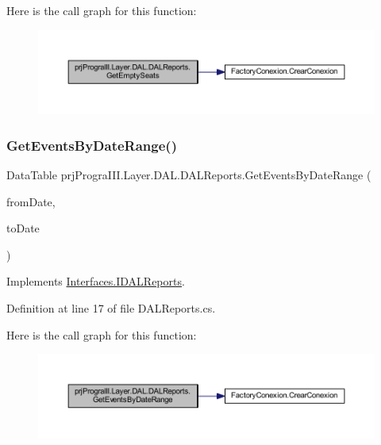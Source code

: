 Here is the call graph for this function\+:
\nopagebreak
\begin{figure}[H]
\begin{center}
\leavevmode
\includegraphics[width=350pt]{classprj_progra_i_i_i_1_1_layer_1_1_d_a_l_1_1_d_a_l_reports_aac3d2267dc8f67b5b83d3df0c6ce1991_cgraph}
\end{center}
\end{figure}
\hypertarget{classprj_progra_i_i_i_1_1_layer_1_1_d_a_l_1_1_d_a_l_reports_a2046b157360d6d30057943ea83437458}{}\label{classprj_progra_i_i_i_1_1_layer_1_1_d_a_l_1_1_d_a_l_reports_a2046b157360d6d30057943ea83437458} 
\subsubsection{\texorpdfstring{Get\+Events\+By\+Date\+Range()}{GetEventsByDateRange()}}
{\footnotesize\ttfamily Data\+Table prj\+Progra\+I\+I\+I.\+Layer.\+D\+A\+L.\+D\+A\+L\+Reports.\+Get\+Events\+By\+Date\+Range (\begin{DoxyParamCaption}\item[{Date\+Time}]{from\+Date,  }\item[{Date\+Time}]{to\+Date }\end{DoxyParamCaption})}



Implements \hyperlink{interface_interfaces_1_1_i_d_a_l_reports_a7cd9a35b355b8b8ae6dfc43b715758af}{Interfaces.\+I\+D\+A\+L\+Reports}.



Definition at line 17 of file D\+A\+L\+Reports.\+cs.

Here is the call graph for this function\+:
\nopagebreak
\begin{figure}[H]
\begin{center}
\leavevmode
\includegraphics[width=350pt]{classprj_progra_i_i_i_1_1_layer_1_1_d_a_l_1_1_d_a_l_reports_a2046b157360d6d30057943ea83437458_cgraph}
\end{center}
\end{figure}


